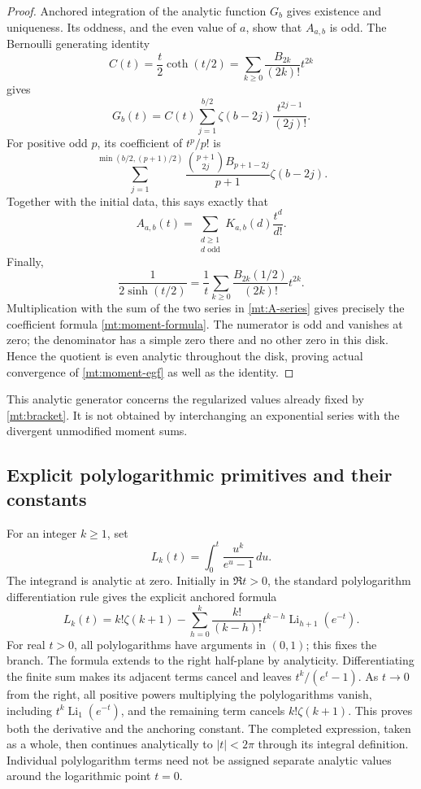 \begin{proof}
Anchored integration of the analytic function $G_b$ gives existence
and uniqueness. Its oddness, and the even value of $a$, show that
$A_{a,b}$ is odd. The Bernoulli generating identity
\[
 C(t)=\frac t2\coth(t/2)
       =\sum_{k\ge0}\frac{B_{2k}}{(2k)!}t^{2k}
\]
gives
\[
 G_b(t)=C(t)\sum_{j=1}^{b/2}\zeta(b-2j)\frac{t^{2j-1}}{(2j)!}.
\]
For positive odd $p$, its coefficient of $t^p/p!$ is
\[
 \sum_{j=1}^{\min(b/2,(p+1)/2)}
   \frac{\binom{p+1}{2j}B_{p+1-2j}}{p+1}\zeta(b-2j).
\]
Together with the initial data, this says exactly that
\begin{equation}\label{mt:A-series}
 A_{a,b}(t)=\sum_{\substack{d\ge1\\d\text{ odd}}}
                             K_{a,b}(d)\frac{t^d}{d!}.
\end{equation}
Finally,
\[
 \frac1{2\sinh(t/2)}
     =\frac1t\sum_{k\ge0}\frac{B_{2k}(1/2)}{(2k)!}t^{2k}.
\]
Multiplication with the sum of the two series in
\eqref{mt:A-series} gives precisely the coefficient formula
\eqref{mt:moment-formula}. The numerator is odd and vanishes at zero;
the denominator has a simple zero there and no other zero in this
disk. Hence the quotient is even analytic throughout the disk, proving
actual convergence of \eqref{mt:moment-egf} as well as the identity.
\end{proof}

This analytic generator concerns the regularized values already fixed
by \eqref{mt:bracket}. It is not obtained by interchanging an exponential
series with the divergent unmodified moment sums.

\subsection{Explicit polylogarithmic primitives and their constants}

For an integer $k\ge1$, set
\begin{equation}\label{mt:L-integral}
 L_k(t)=\int_0^t\frac{u^k}{e^u-1}\,du.
\end{equation}
The integrand is analytic at zero. Initially in $\Re t>0$, the standard
polylogarithm differentiation rule \cite[\S25.12]{DLMFPolylog} gives the explicit anchored formula
\begin{equation}\label{mt:L-polylog}
 L_k(t)=k!\zeta(k+1)
 -\sum_{h=0}^k\frac{k!}{(k-h)!}
                      t^{k-h}\operatorname{Li}_{h+1}(e^{-t}).
\end{equation}
For real $t>0$, all polylogarithms have arguments in $(0,1)$; this fixes
the branch. The formula extends to the right half-plane by analyticity.
Differentiating the finite sum makes its adjacent terms cancel and
leaves $t^k/(e^t-1)$. As $t\to0$ from the right, all positive powers
multiplying the polylogarithms vanish, including
$t^k\operatorname{Li}_1(e^{-t})$, and the remaining term cancels
$k!\zeta(k+1)$. This proves both the derivative and the anchoring
constant. The completed expression, taken as a whole, then continues
analytically to $|t|<2\pi$ through its integral definition. Individual
polylogarithm terms need not be assigned separate analytic values
around the logarithmic point $t=0$.

